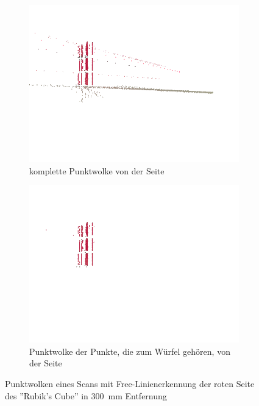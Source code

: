 \documentclass[ngerman,a4paper,parskip=half]{scrartcl}
\begin{document}
\begin{figure}[H]
\begin{subfigure}{0.45\textwidth}
		\includegraphics[width=\textwidth,frame]{includes/free_red_pos1.png}
		\caption{komplette Punktwolke von der Seite \\ \mbox{}}
	\end{subfigure}
	\hfill
	\begin{subfigure}{0.45\textwidth}
		\includegraphics[width=\textwidth,frame]{includes/free_only_red_pos1.png}
		\caption{Punktwolke der Punkte, die zum Würfel gehören, von der Seite}
	\end{subfigure}
	\caption{Punktwolken eines Scans mit Free-Linienerkennung der roten Seite des ''Rubik's Cube'' in 300~mm Entfernung}
\end{figure}
\end{document}

